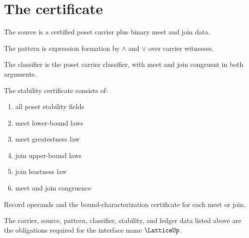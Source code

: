 \section{The certificate}

\begin{definition}
\label{def:lattice-source-specification}
The source is a certified poset carrier plus binary meet and join data.
\end{definition}

\begin{definition}
\label{def:lattice-pattern-specification}
The pattern is expression formation by \(\wedge\) and \(\vee\) over carrier witnesses.
\end{definition}

\begin{definition}
\label{def:lattice-classifier-specification}
The classifier is the poset carrier classifier, with meet and join congruent in both arguments.
\end{definition}

\begin{definition}
\label{def:lattice-stability-certificate}
The stability certificate consists of:
\begin{enumerate}
  \item all poset stability fields
  \item meet lower-bound laws
  \item meet greatestness law
  \item join upper-bound laws
  \item join leastness law
  \item meet and join congruence
\end{enumerate}
\end{definition}

\begin{definition}
\label{def:lattice-ledger-policy}
Record operands and the bound-characterization certificate for each meet or join.
\end{definition}

\begin{definition}
\label{def:lattice-certificate-obligations}
The carrier, source, pattern, classifier, stability, and ledger data listed above are the obligations required for the interface name \(\LatticeUp\).
\end{definition}

